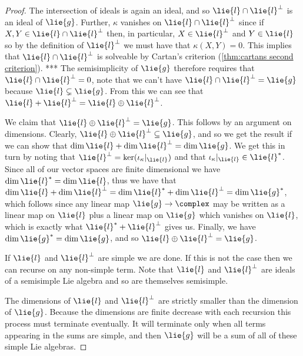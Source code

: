 \documentclass[fleqn]{NotesClass}
\begin{document}
\begin{thm}{}{}
\begin{proof}
            The intersection of ideals is again an ideal, and so \(\lie{l} \cap \lie{l}^{\perp}\) is an ideal of \(\lie{g}\).
            Further, \(\kappa\) vanishes on \(\lie{l} \cap \lie{l}^{\perp}\) since if \(X, Y \in \lie{l} \cap \lie{l}^{\perp}\) then, in particular, \(X \in \lie{l}^{\perp}\) and \(Y \in \lie{l}\) so by the definition of \(\lie{l}^{\perp}\) we must have that \(\kappa(X, Y) = 0\).
            This implies that \(\lie{l} \cap \lie{l}^{\perp}\) is solveable by Cartan's criterion (\cref{thm:cartans second criterion}).
            ***
            The semisimplicity of \(\lie{g}\) therefore requires that \(\lie{l} \cap \lie{l}^{\perp} = 0\), note that we can't have \(\lie{l} \cap \lie{l}^{\perp} = \lie{g}\) because \(\lie{l} \subsetneq \lie{g}\).
            From this we can see that \(\lie{l} + \lie{l}^{\perp} = \lie{l} \oplus \lie{l}^{\perp}\).
            
            We claim that \(\lie{l} \oplus \lie{l}^{\perp} = \lie{g}\).
            This follows by an argument on dimensions.
            Clearly, \(\lie{l} \oplus \lie{l}^{\perp} \subseteq \lie{g}\), and so we get the result if we can show that \(\dim \lie{l} + \dim \lie{l}^{\perp} = \dim \lie{g}\).
            We get this in turn by noting that \(\lie{l}^{\perp} = \ker(\iota_\kappa|_{\lie{l}})\) and that \(\iota_\kappa|_{\lie{l}} \in \lie{l}^*\).
            Since all of our vector spaces are finite dimensional we have \(\dim \lie{l}^* = \dim \lie{l}\), thus we have that \(\dim \lie{l} + \dim \lie{l}^{\perp} = \dim \lie{l}^* + \dim \lie{l}^{\perp} = \dim \lie{g}^*\), which follows since any linear map \(\lie{g} \to \complex\) may be written as a linear map on \(\lie{l}\) plus a linear map on \(\lie{g}\) which vanishes on \(\lie{l}\), which is exactly what \(\lie{l}^* + \lie{l}^{\perp}\) gives us.
            Finally, we have \(\dim \lie{g}^* = \dim\lie{g}\), and so \(\lie{l} \oplus \lie{l}^{\perp} = \lie{g}\).
            
            If \(\lie{l}\) and \(\lie{l}^{\perp}\) are simple we are done.
            If this is not the case then we can recurse on any non-simple term.
            Note that \(\lie{l}\) and \(\lie{l}^{\perp}\) are ideals of a semisimple Lie algebra and so are themselves semisimple.
            
            The dimensions of \(\lie{l}\) and \(\lie{l}^{\perp}\) are strictly smaller than the dimension of \(\lie{g}\).
            Because the dimensions are finite decrease with each recursion this process must terminate eventually.
            It will terminate only when all terms appearing in the sums are simple, and then \(\lie{g}\) will be a sum of all of these simple Lie algebras.
            

\end{proof}
\end{thm}
\end{document}
